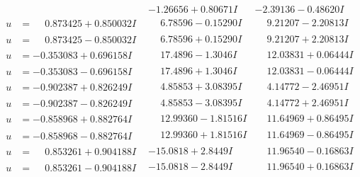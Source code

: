 \documentclass[1p]{elsarticle_modified}
\theoremstyle{definition}
\begin{document}
$$\begin{array}{c|c|c}
 & -1.26656 + 0.80671 I & -2.39136 - 0.48620 I \\ \hline\begin{aligned}
u &= \phantom{-}0.873425 + 0.850032 I\end{aligned}
 & \phantom{-}6.78596 - 0.15290 I & \phantom{-}9.21207 - 2.20813 I \\ \hline\begin{aligned}
u &= \phantom{-}0.873425 - 0.850032 I\end{aligned}
 & \phantom{-}6.78596 + 0.15290 I & \phantom{-}9.21207 + 2.20813 I \\ \hline\begin{aligned}
u &= -0.353083 + 0.696158 I\end{aligned}
 & \phantom{-}17.4896 - 1.3046 I & \phantom{-}12.03831 + 0.06444 I \\ \hline\begin{aligned}
u &= -0.353083 - 0.696158 I\end{aligned}
 & \phantom{-}17.4896 + 1.3046 I & \phantom{-}12.03831 - 0.06444 I \\ \hline\begin{aligned}
u &= -0.902387 + 0.826249 I\end{aligned}
 & \phantom{-}4.85853 + 3.08395 I & \phantom{-}4.14772 - 2.46951 I \\ \hline\begin{aligned}
u &= -0.902387 - 0.826249 I\end{aligned}
 & \phantom{-}4.85853 - 3.08395 I & \phantom{-}4.14772 + 2.46951 I \\ \hline\begin{aligned}
u &= -0.858968 + 0.882764 I\end{aligned}
 & \phantom{-}12.99360 - 1.81516 I & \phantom{-}11.64969 + 0.86495 I \\ \hline\begin{aligned}
u &= -0.858968 - 0.882764 I\end{aligned}
 & \phantom{-}12.99360 + 1.81516 I & \phantom{-}11.64969 - 0.86495 I \\ \hline\begin{aligned}
u &= \phantom{-}0.853261 + 0.904188 I\end{aligned}
 & -15.0818 + 2.8449 I & \phantom{-}11.96540 - 0.16863 I \\ \hline\begin{aligned}
u &= \phantom{-}0.853261 - 0.904188 I\end{aligned}
 & -15.0818 - 2.8449 I & \phantom{-}11.96540 + 0.16863 I \\ \hline\begin{aligned}

\end{aligned}
\end{array}$$
\end{document}
